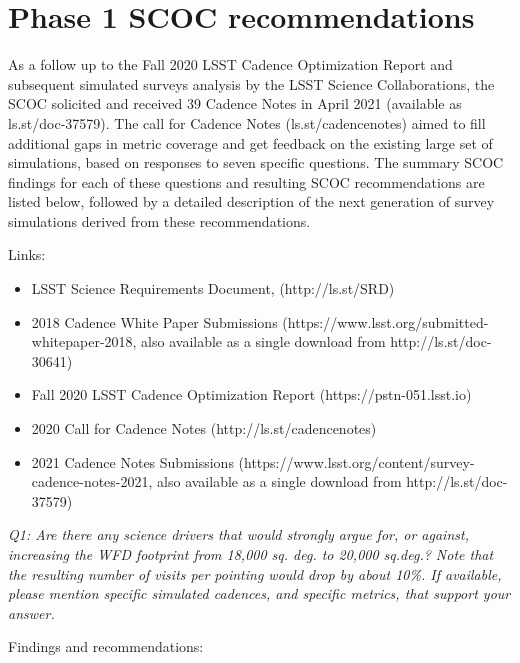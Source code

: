 \section{Phase 1 SCOC recommendations}

As a follow up to the Fall 2020 LSST Cadence Optimization Report and subsequent simulated surveys analysis by the LSST Science Collaborations, the SCOC solicited and received 39 Cadence Notes in April 2021 (available as ls.st/doc-37579). The call for Cadence Notes (ls.st/cadencenotes) aimed to fill additional gaps in metric coverage and get feedback on the existing large set of simulations, based on responses to seven specific questions. The summary SCOC  findings for each of these questions and resulting SCOC recommendations are listed below, followed by a detailed description of the next generation of survey simulations derived from these recommendations. 

Links:
\begin{itemize}
\item LSST Science Requirements Document,  (http://ls.st/SRD)
\item 2018 Cadence White Paper Submissions (https://www.lsst.org/submitted-whitepaper-2018, also available as a single download from http://ls.st/doc-30641)
\item Fall 2020 LSST Cadence Optimization Report (https://pstn-051.lsst.io)
\item 2020 Call for Cadence Notes (http://ls.st/cadencenotes)
\item 2021 Cadence Notes Submissions (https://www.lsst.org/content/survey-cadence-notes-2021, also available as a single download from http://ls.st/doc-37579)
\end{itemize}

{\it Q1: Are there any science drivers that would strongly argue for, or against, increasing the WFD footprint from 18,000 sq. deg. to 20,000 sq.deg.? Note that the resulting number of visits per pointing would drop by about 10\%. If available, please mention specific simulated cadences, and specific metrics, that support your answer. }
 
Findings and recommendations:

